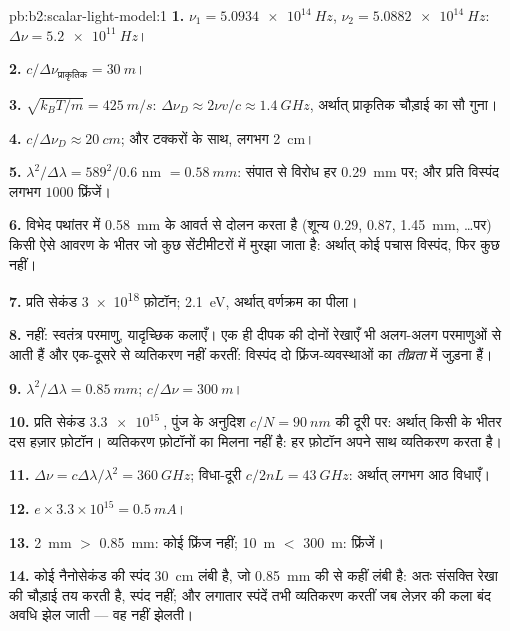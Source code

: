 \begin{solution}{pb:b2:scalar-light-model:1}
\textbf{1.} $\nu_1 = \qty{5.0934e14}{Hz}$, $\nu_2 = \qty{5.0882e14}{Hz}$: $\Delta\nu = \qty{5.2e11}{Hz}$।

\textbf{2.} $c/\Delta\nu_{\text{प्राकृतिक}} = \qty{30}{m}$।

\textbf{3.} $\sqrt{k_BT/m} = \qty{425}{m/s}$: $\Delta\nu_D \approx 2\nu v/c \approx \qty{1.4}{GHz}$, अर्थात्
प्राकृतिक चौड़ाई का सौ गुना।

\textbf{4.} $c/\Delta\nu_D \approx \qty{20}{cm}$; और टक्करों के साथ, लगभग \qty{2}{cm}।

\textbf{5.} $\lambda^2/\Delta\lambda = 589^2/0.6$ nm $= \qty{0.58}{mm}$: संपात से
विरोध हर \qty{0.29}{mm} पर; और प्रति विस्पंद लगभग $1000$ फ्रिंजें।

\textbf{6.} विभेद पथांतर में \qty{0.58}{mm} के आवर्त से दोलन करता है
(शून्य $0.29$, $0.87$, \qty{1.45}{mm}, \dots पर) किसी ऐसे आवरण के भीतर
जो कुछ सेंटीमीटरों में मुरझा जाता है: अर्थात् कोई पचास विस्पंद, फिर कुछ नहीं।

\textbf{7.} प्रति सेकंड \qty{3e18}{} फ़ोटॉन; \qty{2.1}{eV}, अर्थात् वर्णक्रम का
पीला।

\textbf{8.} नहीं: स्वतंत्र परमाणु, यादृच्छिक कलाएँ। एक ही दीपक की दोनों
रेखाएँ भी अलग-अलग परमाणुओं से आती हैं और एक-दूसरे से व्यतिकरण नहीं
करतीं: विस्पंद दो फ्रिंज-व्यवस्थाओं का \emph{तीव्रता} में जुड़ना हैं।

\textbf{9.} $\lambda^2/\Delta\lambda = \qty{0.85}{mm}$; $c/\Delta\nu = \qty{300}{m}$।

\textbf{10.} प्रति सेकंड $\qty{3.3e15}{}$, पुंज के अनुदिश $c/N = \qty{90}{nm}$ की दूरी पर:
अर्थात् किसी  के भीतर दस हज़ार फ़ोटॉन। व्यतिकरण
फ़ोटॉनों का मिलना नहीं है: हर फ़ोटॉन अपने साथ व्यतिकरण करता है।

\textbf{11.} $\Delta\nu = c\Delta\lambda/\lambda^2 = \qty{360}{GHz}$; विधा-दूरी $c/2nL = \qty{43}{GHz}$:
अर्थात् लगभग आठ विधाएँ।

\textbf{12.} $e \times 3.3 \times 10^{15} = \qty{0.5}{mA}$।

\textbf{13.} \qty{2}{mm} $>$ \qty{0.85}{mm}: कोई फ्रिंज नहीं; \qty{10}{m} $<$ \qty{300}{m}: फ्रिंजें।

\textbf{14.} कोई नैनोसेकंड की स्पंद \qty{30}{cm} लंबी है, जो \qty{0.85}{mm} की
 से कहीं लंबी है: अतः संसक्ति रेखा की चौड़ाई तय करती है,
स्पंद नहीं; और लगातार स्पंदें तभी व्यतिकरण करतीं जब लेज़र की कला
बंद अवधि झेल जाती --- वह नहीं झेलती।


\end{solution}

